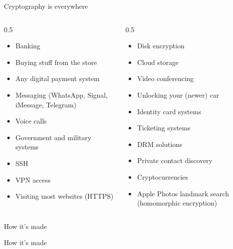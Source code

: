 \ifdefined\PRESENTATION\else\PassOptionsToClass{handout}{beamer}\fi\documentclass[aspectratio=169, lualatex]{beamer}
\begin{document}
\begin{frame}{Cryptography is everywhere}
	\begin{columns}[c]
		\begin{column}{0.5\textwidth}
			\begin{itemize}[<+->]
				\item Banking
				\item Buying stuff from the store
				\item Any digital payment system
				\item Messaging (WhatsApp, Signal, iMessage, Telegram)
				\item Voice calls
				\item Government and military systems
				\item SSH
				\item VPN access
				\item Visiting most websites (HTTPS)
			\end{itemize}
		\end{column}
		\begin{column}{0.5\textwidth}
			\begin{itemize}[<+->]
				\item Disk encryption
				\item Cloud storage
				\item Video conferencing
				\item Unlocking your (newer) car
				\item Identity card systems
				\item Ticketing systems
				\item DRM solutions
				\item Private contact discovery
				\item Cryptocurrencies
				\item Apple Photos landmark search (homomorphic encryption)
			\end{itemize}
		\end{column}
	\end{columns}
\end{frame}

\begin{frame}{How it's made}
\end{frame}

\begin{frame}{How it's made}
\end{frame}
\end{document}
